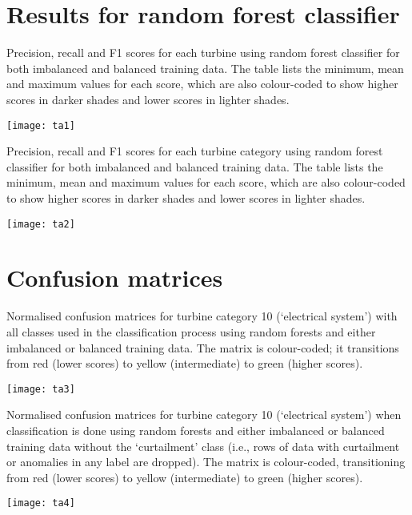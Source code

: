 \chapter{Results for random forest classifier}\label{a3}

\begin{landscape}
  \begin{table}
    \centering
    \captionsetup{labelformat=empty,list=no}
    \caption{Precision, recall and F1 scores for each turbine using random forest classifier for both imbalanced and balanced training data. The table lists the minimum, mean and maximum values for each score, which are also colour-coded to show higher scores in darker shades and lower scores in lighter shades.}
    \texttt{[image: ta1]}
  \end{table}
\end{landscape}

\begin{table}
  \centering
  \captionsetup{labelformat=empty,list=no}
  \caption{Precision, recall and F1 scores for each turbine category using random forest classifier for both imbalanced and balanced training data. The table lists the minimum, mean and maximum values for each score, which are also colour-coded to show higher scores in darker shades and lower scores in lighter shades.}
  \texttt{[image: ta2]}
\end{table}

\chapter{Confusion matrices}\label{a4}

\begin{table}
  \centering
  \captionsetup{labelformat=empty,list=no}
  \caption{Normalised confusion matrices for turbine category 10 (`electrical system') with all classes used in the classification process using random forests and either imbalanced or balanced training data. The matrix is colour-coded; it transitions from red (lower scores) to yellow (intermediate) to green (higher scores).}
  \texttt{[image: ta3]}
\end{table}

\begin{table}
  \centering
  \captionsetup{labelformat=empty,list=no}
  \caption{Normalised confusion matrices for turbine category 10 (`electrical system') when classification is done using random forests and either imbalanced or balanced training data without the `curtailment' class (i.e., rows of data with curtailment or anomalies in any label are dropped). The matrix is colour-coded, transitioning from red (lower scores) to yellow (intermediate) to green (higher scores).}
  \texttt{[image: ta4]}
\end{table}

